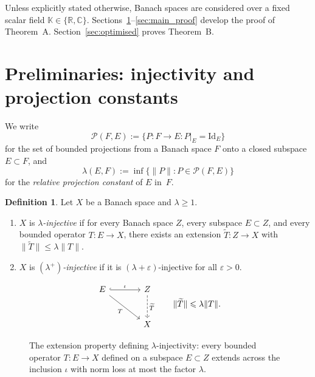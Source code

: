 \documentclass[11pt]{amsart}
\renewcommand{\le}{\leqslant}
\renewcommand{\ge}{\geqslant}
\theoremstyle{definition}
\newtheorem{definition}[theorem]{Definition}
\theoremstyle{remark}
\theoremstyle{plain}
\numberwithin{equation}{section}
\newcommand{\R}{\mathbb{R}}
\newcommand{\C}{\mathbb{C}}
\newcommand{\id}{\mathrm{Id}}
\begin{document}
Unless explicitly stated otherwise, Banach spaces are considered over a
fixed scalar field $\mathbb K\in\{\R,\C\}$.
Sections~\ref{sec:prelim}--\ref{sec:main_proof} develop the proof of
Theorem~A.  Section~\ref{sec:optimised} proves Theorem~B.


\section{Preliminaries: injectivity and projection constants}%
\label{sec:prelim}

We write
\[
\mathcal P(F,E):=\{P\colon F\to E : P|_E=\id_E\}
\]
for the set of bounded projections from a Banach space $F$ onto a closed
subspace $E\subset F$, and
\[
\lambda(E,F):=\inf\{\|P\|: P\in\mathcal P(F,E)\}
\]
for the \emph{relative projection constant} of $E$ in~$F$.

\begin{definition}\label{def:injective}
Let $X$ be a Banach space and $\lambda\ge 1$.
\begin{enumerate}[label=(\roman*)]
\item $X$ is \emph{$\lambda$-injective} if for every Banach space $Z$,
every subspace $E\subset Z$, and every bounded operator $T:E\to X$,
there exists an extension $\widetilde T:Z\to X$ with
$\|\widetilde T\|\le \lambda\|T\|$.
\item $X$ is \emph{$(\lambda^+)$-injective} if it is
$(\lambda+\varepsilon)$-injective for all $\varepsilon>0$.
\end{enumerate}
\end{definition}

\begin{figure}[t]
\[
\begin{tikzcd}[column sep=large,row sep=large]
E \arrow[r, hook, "\iota"] \arrow[dr, "T"'] &
Z \arrow[d, dashed, "\widetilde T"] \\
& X
\end{tikzcd}
\qquad
\|\widetilde T\|\le \lambda\|T\|.
\]
\caption{The extension property defining $\lambda$-injectivity:
every bounded operator $T\colon E\to X$ defined on a subspace
$E\subset Z$ extends across the inclusion $\iota$ with norm loss at
most the factor $\lambda$.}
\label{fig:lambda-injectivity}
\end{figure}
\end{document}
